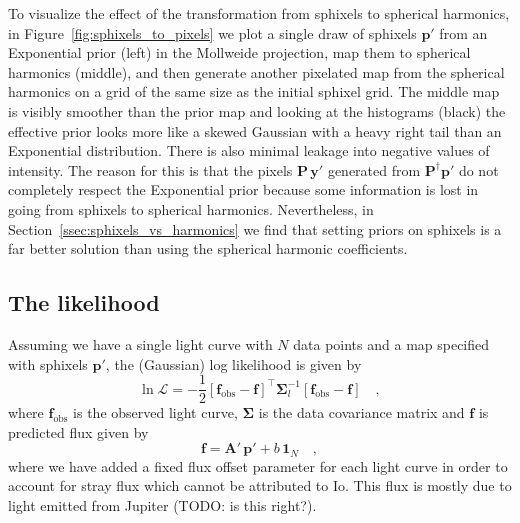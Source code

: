 \documentclass[modern]{aastex62}
\begin{document}
To visualize the effect of the transformation from sphixels to spherical harmonics, in Figure~\ref{fig:sphixels_to_pixels} we plot a single draw of sphixels $\mathbf{p}'$ from an Exponential prior (left) in the Mollweide projection, map them to spherical harmonics (middle), and then generate another pixelated map from the spherical harmonics on a grid of the same size as the initial sphixel grid.
The middle map is visibly smoother than the prior map and looking at the histograms (black) the effective prior looks more like a skewed Gaussian with a heavy right tail than an Exponential distribution.
There is also minimal leakage into negative values of intensity.
The reason for this is that the pixels $\mathbf{P}\,\mathbf{y}'$ generated from $\mathbf{P}^\dagger\mathbf{p}'$ do not completely respect the Exponential prior because some information is lost in going from sphixels to spherical harmonics.
Nevertheless, in Section~\ref{ssec:sphixels_vs_harmonics} we find that setting priors on sphixels is a far better solution than using the spherical harmonic coefficients.

\subsection{The likelihood}
\label{ssec:likelihood}
Assuming we have a single light curve with $N$ data points and a map specified with sphixels $\mathbf{p}'$, the (Gaussian) log likelihood is given by
\begin{equation}
    \ln\mathcal{L}=-\frac{1}{2}\left[\mathbf{f}_\mathrm{obs}-\mathbf{f} \right]^{\top}
    \boldsymbol{\Sigma}_l^{-1}\left[\mathbf{f}_\mathrm{obs}-\mathbf{f} \right]
    \quad,
    \label{eq:likelihood}
\end{equation}
where $\mathbf{f}_\mathrm{obs}$ is the observed light curve, $\boldsymbol{\Sigma}$ is the data covariance matrix and $\mathbf{f}$ is predicted flux given by
\begin{equation}
    \mathbf{f}=\mathbf{A}'\,\mathbf{p}' +b\,\mathbf{1}_N
    \quad,
    \label{eq:flux_model}
\end{equation}
where we have added a fixed flux offset parameter for each light curve in order to account for stray flux which cannot be attributed to Io.
This flux is mostly due to light emitted from Jupiter (TODO: is this right?).
\end{document}
